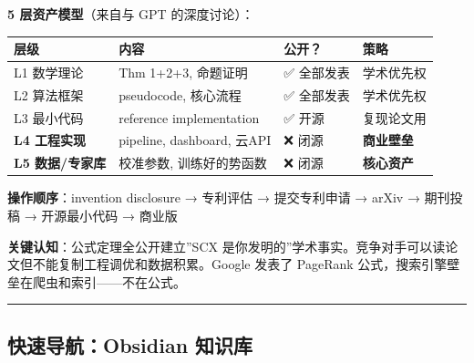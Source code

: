 \documentclass[
  12pt,
]{ctexart}
\begin{document}
\textbf{5 层资产模型}（来自与 GPT 的深度讨论）：

\begin{longtable}[]{@{}
  >{\raggedright\arraybackslash}p{}
  >{\raggedright\arraybackslash}p{}
  >{\centering\arraybackslash}p{}
  >{\raggedright\arraybackslash}p{}@{}}
\toprule\noalign{}
\begin{minipage}[b]{\linewidth}\raggedright
层级
\end{minipage} & \begin{minipage}[b]{\linewidth}\raggedright
内容
\end{minipage} & \begin{minipage}[b]{\linewidth}\centering
公开？
\end{minipage} & \begin{minipage}[b]{\linewidth}\raggedright
策略
\end{minipage} \\
\midrule\noalign{}
\endhead
\bottomrule\noalign{}
\endlastfoot
L1 数学理论 & Thm 1+2+3, 命题证明 & ✅ 全部发表 & 学术优先权 \\
L2 算法框架 & pseudocode, 核心流程 & ✅ 全部发表 & 学术优先权 \\
L3 最小代码 & reference implementation & ✅ 开源 & 复现论文用 \\
\textbf{L4 工程实现} & pipeline, dashboard, 云API & ❌ 闭源 &
\textbf{商业壁垒} \\
\textbf{L5 数据/专家库} & 校准参数, 训练好的势函数 & ❌ 闭源 &
\textbf{核心资产} \\
\end{longtable}

\textbf{操作顺序}：invention disclosure → 专利评估 → 提交专利申请 →
arXiv → 期刊投稿 → 开源最小代码 → 商业版

\textbf{关键认知}：公式定理全公开建立''SCX
是你发明的''学术事实。竞争对手可以读论文但不能复制工程调优和数据积累。Google
发表了 PageRank 公式，搜索引擎壁垒在爬虫和索引------不在公式。

\begin{center}\rule{0.5\linewidth}{0.5pt}\end{center}

\subsection{快速导航：Obsidian
知识库}\label{ux5febux901fux5bfcux822aobsidian-ux77e5ux8bc6ux5e93}
\end{document}
